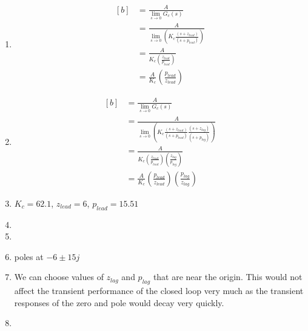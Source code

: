 \documentclass[12pt]{article}
\begin{document}
\begin{enumerate}
	\item %
	\begin{equation} \label{eq:3}
	\begin{aligned}[b]
		&= \frac{A}{\lim_{s \to 0}G_c(s)} \\
		&= \frac{A}{\lim_{s \to 0} \left( K_c \frac{(s+z_{lead})}{(s+p_{lead})} \right)} \\
		&= \frac{A}{K_c \left( \frac{z_{lead}}{p_{lead}} \right)} \\
		&= \frac{A}{K_c} \left( \frac{p_{lead}}{z_{lead}} \right)
	\end{aligned}
	\end{equation}
	
	\item %
	\begin{equation} \label{eq:4}
		\begin{aligned}[b]
			&= \frac{A}{\lim_{s \to 0}G_c(s)} \\
			&= \frac{A}{\lim_{s \to 0} \left( K_c \frac{(s+z_{lead})}{(s+p_{lead})} \frac{(s+z_{lag})}{(s+p_{lag})} \right)} \\
			&= \frac{A}{K_c \left ( \frac{z_{lead}}{p_{lead}} \right) \left( \frac{z_{lag}}{p_{lag}} \right)} \\
			&= \frac{A}{K_c} \left( \frac{p_{lead}}{z_{lead}} \right) \left( \frac{p_{lag}}{z_{lag}} \right)
		\end{aligned}
		\end{equation}
	
	\item %
	$K_c = 62.1$, $z_{lead} = 6$, $p_{lead} = 15.51$
	
	\item %
	
	\item %

	\item %
	poles at $-6 \pm 15j$
	
	\item %
	We can choose values of $z_{lag}$ and $p_{lag}$ that are near the origin. This would not affect the transient performance of the closed loop very much as the transient responses of the zero and pole would decay very quickly. 
	
	\item %
	
\end{enumerate}
\end{document}
